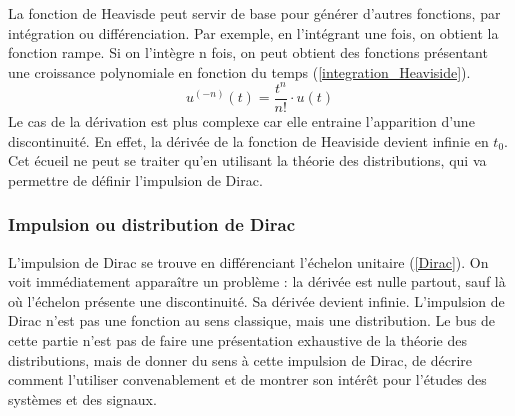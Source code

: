 	La fonction de Heavisde peut servir de base pour générer d'autres fonctions, par intégration ou différenciation. Par exemple, en l'intégrant une fois, on obtient la fonction rampe. Si on l'intègre n fois, on peut obtient des fonctions présentant une croissance polynomiale en fonction du temps (\ref{integration_Heaviside}). 
	\begin{equation}\label{integration_Heaviside}
	u^{(-n)}(t) = \frac{t^{n}}{n!} \cdot u(t)	 	
	\end{equation}	
	Le cas de la dérivation est plus complexe car elle entraine l'apparition d'une discontinuité. En effet, la dérivée de la fonction de Heaviside devient infinie en $t_{0}$. Cet écueil ne peut se traiter qu'en utilisant la théorie des distributions, qui va permettre de définir l'impulsion de Dirac.
	
	\subsubsection{Impulsion ou distribution de Dirac}
	
	L'impulsion de Dirac se trouve en différenciant l'échelon unitaire (\ref{Dirac}). On
	voit immédiatement apparaître un problème : la dérivée est nulle partout, sauf là
	où l'échelon présente une discontinuité. Sa dérivée devient infinie.
	L'impulsion de Dirac n'est pas une fonction au sens classique, mais une
	distribution. Le bus de cette partie n'est pas de faire une présentation exhaustive de la théorie des distributions, mais de donner du sens à cette impulsion de Dirac, de décrire comment l'utiliser convenablement et de montrer son intérêt pour l'études des systèmes et des signaux. 

